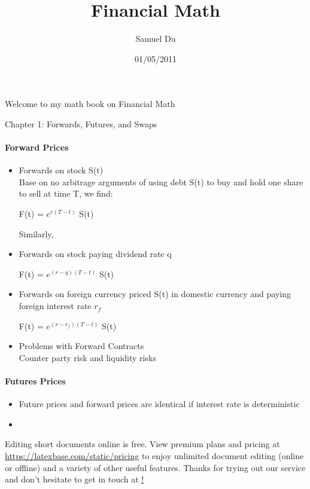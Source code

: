 \documentclass[12pt]{article}
\title{Financial Math}
\author{Samuel Du}
\date{01/05/2011}
\begin{document}
\maketitle

Welcome to my math book on Financial Math


Chapter 1: Forwards, Futures, and Swaps
\paragraph{Forward Prices}
\begin{itemize}
	\item Forwards on stock S(t)\\
	Base on no arbitrage arguments of using debt S(t) to buy and hold one share to sell at time T, we find:

 \begin{center} F(t) = ${e^{r(T-t)}}$ S(t) \end{center}
 
 Similarly,
 
 \item Forwards on stock paying dividend rate q
 
 \begin{center} F(t) = ${e^{(r-q)(T-t)}}$ S(t) \end{center}
 
 \item Forwards on foreign currency priced S(t) in domestic currency and paying foreign interest rate ${r_f}$
 	\begin{center} F(t) = ${e^{(r-r_f)(T-t)}}$ S(t) \end{center}
 	
 \item Problems with Forward Contracts \\
 	Counter party risk and liquidity risks
 \end{itemize}

\paragraph{Futures Prices}

 
\begin{itemize}
	\item Future prices and forward prices are identical if interest rate is deterministic
	\item 
  
\end{itemize}

Editing short documents online is free. View premium plans and pricing at
\url{https://latexbase.com/static/pricing} to enjoy unlimited document editing
(online or offline) and a variety of other useful features. Thanks for trying
out our service and don't hesitate to get in touch at
\href{mailto:shdu@yahoo.com}!
\end{document}
